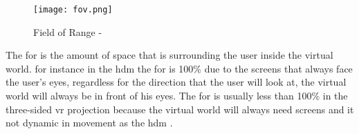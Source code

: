 \begin{figure}[h]
    \centering
    \texttt{[image: fov.png]}
    \caption{Field of Range - \citep{William}}
    \label{fig:fod}
\end{figure}

The \acrfull{for} is the amount of space that is surrounding the user inside the virtual world. for instance in the \acrshort{hdm} the \acrshort{for} is 100\% due to the screens that always face the user's eyes, regardless for the direction that the user will look at, the virtual world will always be in front of his eyes. The \acrshort{for} is usually less than 100\% in the three-sided \acrshort{vr} projection because the virtual world will always need screens and it not dynamic in movement as the \acrfull{hdm} \citep{William}.










  
  

  
